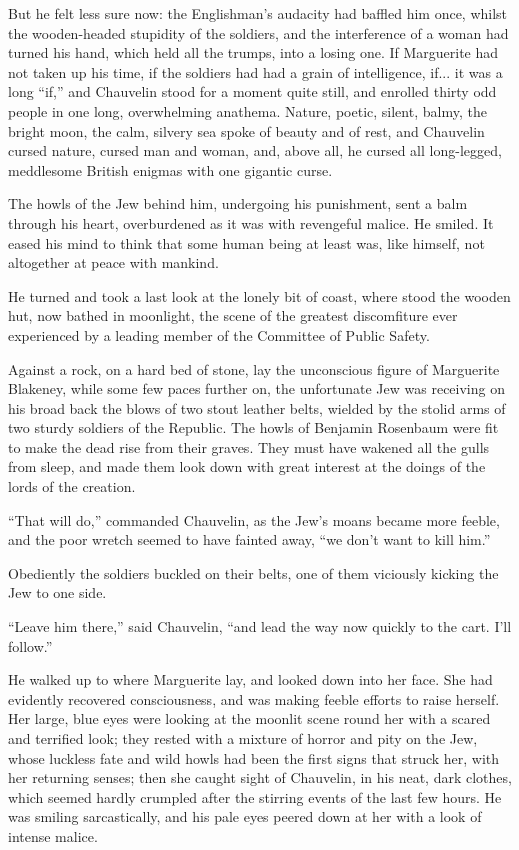 But he felt less sure now: the Englishman's audacity had baffled him once, whilst the wooden-headed stupidity of the soldiers, and the interference of a woman had turned his hand, which held all the trumps, into a losing one. If Marguerite had not taken up his time, if the soldiers had had a grain of intelligence, if... it was a long \enquote{if,} and Chauvelin stood for a moment quite still, and enrolled thirty odd people in one long, overwhelming anathema. Nature, poetic, silent, balmy, the bright moon, the calm, silvery sea spoke of beauty and of rest, and Chauvelin cursed nature, cursed man and woman, and, above all, he cursed all long-legged, meddlesome British enigmas with one gigantic curse.

The howls of the Jew behind him, undergoing his punishment, sent a balm through his heart, overburdened as it was with revengeful malice. He smiled. It eased his mind to think that some human being at least was, like himself, not altogether at peace with mankind.

He turned and took a last look at the lonely bit of coast, where stood the wooden hut, now bathed in moonlight, the scene of the greatest discomfiture ever experienced by a leading member of the Committee of Public Safety.

Against a rock, on a hard bed of stone, lay the unconscious figure of Marguerite Blakeney, while some few paces further on, the unfortunate Jew was receiving on his broad back the blows of two stout leather belts, wielded by the stolid arms of two sturdy soldiers of the Republic. The howls of Benjamin Rosenbaum were fit to make the dead rise from their graves. They must have wakened all the gulls from sleep, and made them look down with great interest at the doings of the lords of the creation.

\enquote{That will do,} commanded Chauvelin, as the Jew's moans became more feeble, and the poor wretch seemed to have fainted away, \enquote{we don't want to kill him.}

Obediently the soldiers buckled on their belts, one of them viciously kicking the Jew to one side.

\enquote{Leave him there,} said Chauvelin, \enquote{and lead the way now quickly to the cart. I'll follow.}

He walked up to where Marguerite lay, and looked down into her face. She had evidently recovered consciousness, and was making feeble efforts to raise herself. Her large, blue eyes were looking at the moonlit scene round her with a scared and terrified look; they rested with a mixture of horror and pity on the Jew, whose luckless fate and wild howls had been the first signs that struck her, with her returning senses; then she caught sight of Chauvelin, in his neat, dark clothes, which seemed hardly crumpled after the stirring events of the last few hours. He was smiling sarcastically, and his pale eyes peered down at her with a look of intense malice.

